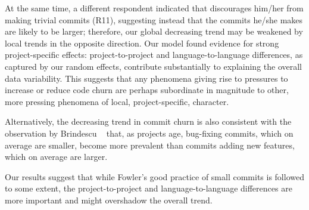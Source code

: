 At the same time, a different respondent indicated that \Tvis discourages 
him/her from making trivial commits (R11), suggesting instead that the 
commits he/she makes are likely to be larger;
therefore, our global decreasing trend may be weakened by local trends
in the opposite direction.
Our model found evidence for strong project-specific effects: 
project-to-project and language-to-language differences, as captured by our 
random effects, contribute substantially to explaining the overall data variability. 
This suggests that any phenomena giving rise to pressures to increase 
or reduce code churn are perhaps subordinate in magnitude to other, 
more pressing phenomena of local, \ie project-specific, character.

Alternatively, the decreasing trend in commit churn is also consistent with 
the observation by Brindescu \etal~\cite{brindescu2014centralized} that, 
as projects age, bug-fixing commits, which on average are smaller, 
become more prevalent than commits adding new features, which on 
average are larger.

Our results suggest that while Fowler's good practice of small commits 
is followed to some extent, the project-to-project and language-to-language 
differences are more important and might overshadow the overall trend.





